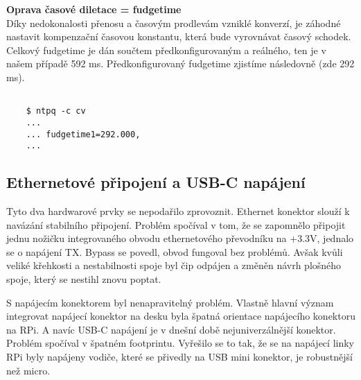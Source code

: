     \textbf{Oprava časové diletace = fudgetime}
    \\

    Díky nedokonalosti přenosu a časovým prodlevám vzniklé konverzí, je záhodné nastavit
    kompenzační časovou konstantu, která bude vyrovnávat časový schodek. Celkový fudgetime
    je dán součtem předkonfigurovaným a reálného, ten je v našem případě 592 ms.
    Předkonfigurovaný fudgetime zjistíme následovně (zde 292 ms).

   \begin{lstlisting}

    $ ntpq -c cv
    ...
    ... fudgetime1=292.000,
    ...
   \end{lstlisting}

\subsection{Ethernetové připojení a USB-C napájení}

Tyto dva hardwarové prvky se nepodařilo zprovoznit. Ethernet konektor slouží k navázání
stabilního připojení. Problém spočíval v tom, že se zapomnělo připojit jednu nožičku
integrovaného obvodu ethernetového převodníku na +3.3V, jednalo se o napájení TX. Bypass
se povedl, obvod fungoval bez problémů. Avšak kvůli veliké křehkosti a nestabilnosti spoje
byl čip odpájen a změněn návrh plošného spoje, který se nestihl znovu poptat.

S napájecím konektorem byl nenapravitelný problém. Vlastně hlavní význam integrovat
napájecí konektor na desku byla špatná orientace napájecího konektoru na RPi. A navíc
USB-C napájení je v dnešní době nejuniverzálnější konektor. Problém spočíval v špatném
footprintu. Vyřešilo se to tak, že se na napájecí linky RPi byly napájeny vodiče, které se
přivedly na USB mini konektor, je robustnější než micro.
